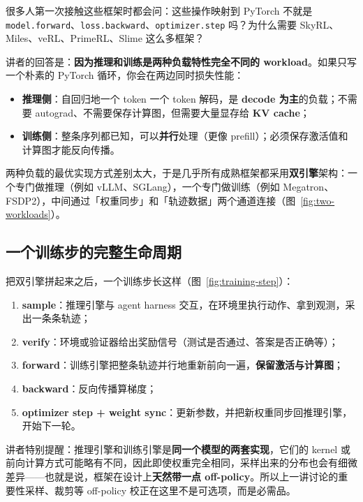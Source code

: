 \documentclass[a4paper]{article}
\begin{document}
\begin{sloppypar}
很多人第一次接触这些框架时都会问：这些操作映射到 PyTorch 不就是 \texttt{model.forward}、\texttt{loss.backward}、\texttt{optimizer.step} 吗？为什么需要 SkyRL、Miles、veRL、PrimeRL、Slime 这么多框架？
\end{sloppypar}

讲者的回答是：\textbf{因为推理和训练是两种负载特性完全不同的 workload}。如果只写一个朴素的 PyTorch 循环，你会在两边同时损失性能：

\begin{itemize}
\item \textbf{推理侧}：自回归地一个 token 一个 token 解码，是 \textbf{decode 为主}的负载；不需要 autograd、不需要保存计算图，但需要大量显存给 \textbf{KV cache}；
\item \textbf{训练侧}：整条序列都已知，可以\textbf{并行}处理（更像 prefill）；必须保存激活值和计算图才能反向传播。
\end{itemize}

两种负载的最优实现方式差别太大，于是几乎所有成熟框架都采用\textbf{双引擎}架构：一个专门做推理（例如 vLLM、SGLang），一个专门做训练（例如 Megatron、FSDP2），中间通过「权重同步」和「轨迹数据」两个通道连接（图~\ref{fig:two-workloads}）。

\subsection{一个训练步的完整生命周期}

把双引擎拼起来之后，一个训练步长这样（图~\ref{fig:training-step}）：

\begin{enumerate}
\item \textbf{sample}：推理引擎与 agent harness 交互，在环境里执行动作、拿到观测，采出一条条轨迹；
\item \textbf{verify}：环境或验证器给出奖励信号（测试是否通过、答案是否正确等）；
\item \textbf{forward}：训练引擎把整条轨迹并行地重新前向一遍，\textbf{保留激活与计算图}；
\item \textbf{backward}：反向传播算梯度；
\item \textbf{optimizer step + weight sync}：更新参数，并把新权重同步回推理引擎，开始下一轮。
\end{enumerate}

讲者特别提醒：推理引擎和训练引擎是\textbf{同一个模型的两套实现}，它们的 kernel 或前向计算方式可能略有不同，因此即使权重完全相同，采样出来的分布也会有细微差异——也就是说，框架在设计上\textbf{天然带一点 off-policy}。所以上一讲讨论的重要性采样、裁剪等 off-policy 校正在这里不是可选项，而是必需品。
\end{document}
